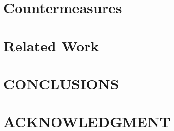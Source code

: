 \documentclass[letterpaper, 10 pt, conference]{ieeeconf}  %
\begin{document}
 
 
 \section {Countermeasures}
 
 
 
 \section {Related Work}
 
 
 
\section{CONCLUSIONS}


\addtolength{\textheight}{-12cm}   %








\section*{ACKNOWLEDGMENT}










\end{document}
